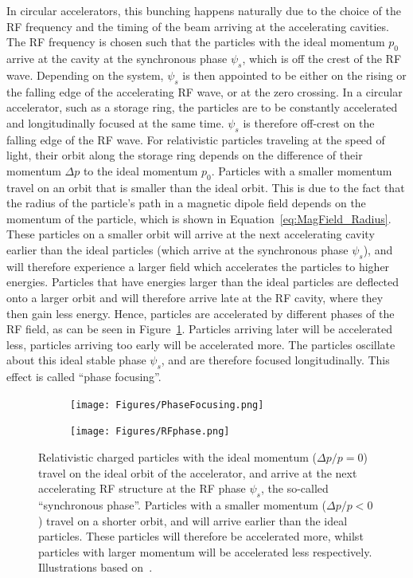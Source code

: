 In circular accelerators, this bunching happens naturally due to the choice of the RF frequency and the timing of the beam arriving at the accelerating cavities.
The RF frequency is chosen such that the particles with the ideal momentum $p_0$ arrive at the cavity at the synchronous phase $\psi_s$, which is off the crest of the RF wave.
Depending on the system,  $\psi_s$ is then appointed to be either on the rising or the falling edge of the accelerating RF wave, or at the zero crossing.
In a circular accelerator, such as a storage ring, the particles are to be constantly accelerated and longitudinally focused at the same time.
$\psi_s$ is therefore off-crest on the falling edge of the RF wave.
For relativistic particles traveling at the speed of light, their orbit along the storage ring depends on the difference of their momentum $\Delta p$ to the ideal momentum $p_0$.
Particles with a smaller momentum travel on an orbit that is smaller than the ideal orbit.
This is due to the fact that the radius of the particle's path in a magnetic dipole field depends on the momentum of the particle, which is shown in Equation~\ref{eq:MagField_Radius}.
These particles on a smaller orbit will arrive at the next accelerating cavity earlier than the ideal particles (which arrive at the synchronous phase $\psi_s$), and will therefore experience a larger field which accelerates the particles to higher energies.
Particles that have energies larger than the ideal particles are deflected onto a larger orbit and will therefore arrive late at the RF cavity, where they then gain less energy. 
Hence, particles are accelerated by different phases of the RF field, as can be seen in Figure~\ref{fig:RFPhase}.
Particles arriving later will be accelerated less, particles arriving too early will be accelerated more.
The particles oscillate about this ideal stable phase $\psi_s$, and are therefore focused longitudinally.
This effect is called ``phase focusing''.
\begin{figure}
\begin{subfigure}[b]{0.4\textwidth}
\centering
 \texttt{[image: Figures/PhaseFocusing.png]}
\end{subfigure}\hfill
\begin{subfigure}[b]{0.49\textwidth}
\centering
 \texttt{[image: Figures/RFphase.png]}
\end{subfigure}
\caption[Phase focusing]{Relativistic charged particles with the ideal momentum ($\Delta p/p = 0$) travel on the ideal orbit of the accelerator, and arrive at the next accelerating RF structure at the RF phase $\psi_s$, the so-called ``synchronous phase''. 
Particles with a smaller momentum ($\Delta p/p < 0$) travel on a shorter orbit, and will arrive earlier than the ideal particles.
These particles will therefore be accelerated more, whilst particles with larger momentum will be accelerated less respectively.
Illustrations based on~\cite{Anke}.}
\label{fig:RFPhase}
\end{figure}

